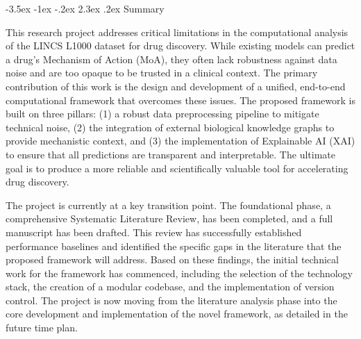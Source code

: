 \documentclass[12pt,a4paper]{article}
\makeatletter
\renewcommand\section{\@startsection{section}{1}{\z@}%
  {-3.5ex \@plus-1ex \@minus-.2ex}%
  {2.3ex \@plus.2ex}%
  {\normalfont\large\bfseries}}
\makeatother
\begin{document}
\section{Summary}

This research project addresses critical limitations in the computational analysis of the LINCS L1000 dataset for drug discovery. While existing models can predict a drug's Mechanism of Action (MoA), they often lack robustness against data noise and are too opaque to be trusted in a clinical context. The primary contribution of this work is the design and development of a unified, end-to-end computational framework that overcomes these issues. The proposed framework is built on three pillars: (1) a robust data preprocessing pipeline to mitigate technical noise, (2) the integration of external biological knowledge graphs to provide mechanistic context, and (3) the implementation of Explainable AI (XAI) to ensure that all predictions are transparent and interpretable. The ultimate goal is to produce a more reliable and scientifically valuable tool for accelerating drug discovery.

The project is currently at a key transition point. The foundational phase, a comprehensive Systematic Literature Review, has been completed, and a full manuscript has been drafted. This review has successfully established performance baselines and identified the specific gaps in the literature that the proposed framework will address. Based on these findings, the initial technical work for the framework has commenced, including the selection of the technology stack, the creation of a modular codebase, and the implementation of version control. The project is now moving from the literature analysis phase into the core development and implementation of the novel framework, as detailed in the future time plan.



\end{document}

